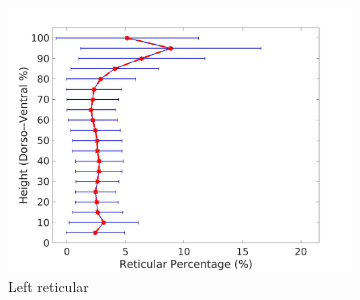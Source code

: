 \begin{figure}[H]
\begin{subfigure}{.42\linewidth}
  \includegraphics[width=\linewidth,trim={{.0\wd0} {.0\wd0} {.0\wd0} {.0\wd0}},clip]{QuantitativeAnalysis/Image/LeftLungReticularDiseaseDorsoToVentral.jpg} %
  \caption{Left reticular}
  \label{fig:DiseaseDorsoToVentral-c} 
\end{subfigure} 
\begin{subfigure}{.42\linewidth}%

\end{subfigure}
\end{figure}
